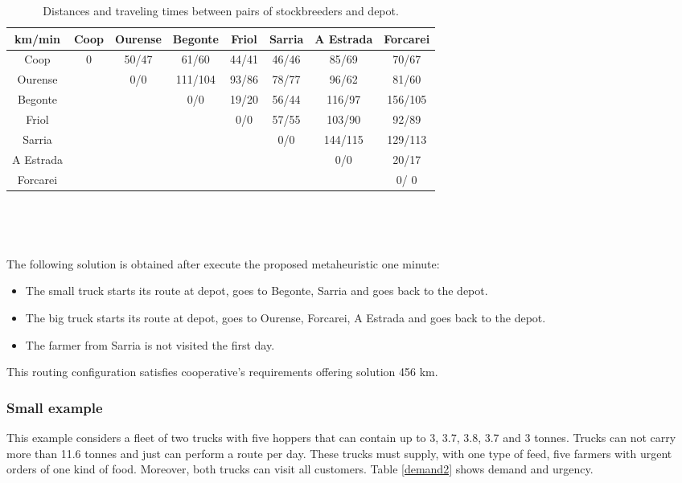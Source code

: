\begin{table}[H]
\centering
\begin{tabular}{c| c c c c c c c}
	\hline 
	km/min  	& Coop & Ourense  & Begonte   &  Friol  &  Sarria   & A Estrada & Forcarei\\
	\hline 
	Coop 		& 	0  & 50/47   &  61/60    &  44/41  &  46/46    &  85/69   & 70/67 \\
	Ourense    	& 	   & 0/0     &  111/104  &  93/86  &  78/77    &  96/62   & 81/60 \\
	Begonte  	& 	   &         &  0/0      &  19/20  &  56/44    &  116/97  & 156/105 \\
	Friol    	& 	   &         &           &  0/0    &  57/55    &  103/90  & 92/89 \\
	Sarria  	&	   &         &           &         &  0/0      &  144/115 & 129/113 \\
	A Estrada 	&	   &         &           &         &           &  0/0     & 20/17 \\
	Forcarei	&	   &         &           &         &           &          & 0/ 0 \\
	\hline 
\end{tabular} \
\caption{Distances and traveling times between pairs of stockbreeders and depot.}
\label{distance1}
\end{table}\

The following solution is obtained after execute the proposed metaheuristic one minute:

\begin{itemize}
\item The small truck starts its route at depot, goes to Begonte, Sarria and goes back to the depot.
\item The big truck starts its route at depot, goes to Ourense, Forcarei, A Estrada and goes back to the depot.
\item The farmer from Sarria is not visited the first day.
\end{itemize}

This routing configuration satisfies cooperative's requirements offering solution 456 km.

\subsubsection{Small example}

This example considers a fleet of two trucks with five hoppers that can contain up to 3, 3.7, 3.8, 3.7 and 3 tonnes. Trucks can not carry more than 11.6 tonnes and just can perform a route per day. These trucks must supply, with one type of feed, five farmers with urgent orders of one kind of food. Moreover, both trucks can visit all customers. Table \ref{demand2} shows demand and urgency.


